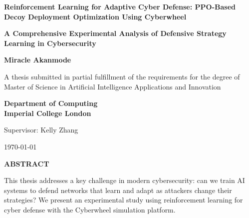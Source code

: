 \documentclass[12pt,oneside,a4paper]{article}
\newcommand{\thesistitle}{Reinforcement Learning for Adaptive Cyber Defense: PPO-Based Decoy Deployment Optimization Using Cyberwheel}
\newcommand{\thesisauthor}{Miracle Akanmode}
\newcommand{\supervisor}{Kelly Zhang}
\newcommand{\degreetype}{Artificial Intelligence Applications and Innovation}
\newcommand{\university}{Imperial College London}
\newcommand{\department}{Department of Computing}
\newcommand{\submissiondate}{\today}
\theoremstyle{definition}
\theoremstyle{plain}
\begin{document}

\begin{titlepage}
\begin{center}
\vspace*{2cm}

{\Huge\textbf{\thesistitle}}

\vspace{1.5cm}

{\large\textbf{A Comprehensive Experimental Analysis of Defensive Strategy Learning in Cybersecurity}}

\vspace{2cm}

{\Large\textbf{\thesisauthor}}

\vspace{1.5cm}

{\large A thesis submitted in partial fulfillment of the requirements for the degree of \\ Master of Science in \degreetype}

\vspace{1.5cm}

{\large\textbf{\department} \\ \textbf{\university}}

\vspace{1cm}

{\large Supervisor: \supervisor}

\vspace{1.5cm}

{\large\submissiondate}

\end{center}
\end{titlepage}

\setcounter{page}{1}

\tableofcontents
\clearpage

\begin{center}
\large\textbf{ABSTRACT}
\end{center}

\vspace{1em}

This thesis addresses a key challenge in modern cybersecurity: can we train AI systems to defend networks that learn and adapt as attackers change their strategies? We present an experimental study using reinforcement learning for cyber defense with the Cyberwheel simulation platform.
\end{document}
